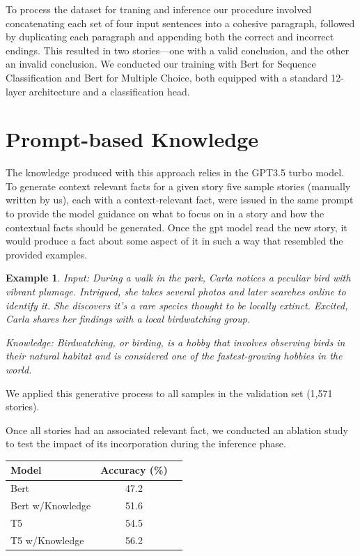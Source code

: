 \documentclass{article}
\begin{document}
\begin{multicols}{2}
To process the dataset for traning and inference our procedure involved concatenating each set of four input sentences into a cohesive paragraph, followed by duplicating each paragraph and appending both the correct and incorrect endings. This resulted in two stories—one with a valid conclusion, and the other an invalid conclusion. We conducted our training with Bert for Sequence Classification and Bert for Multiple Choice, both equipped with a standard 12-layer architecture and a classification head. 

\section{Prompt-based Knowledge}
The knowledge produced with this approach relies in the GPT3.5 turbo model. To generate context relevant facts for a given story five sample stories (manually written by us), each with a context-relevant fact, were issued in the same prompt to provide the model guidance on what to focus on in a story and how the contextual facts should be generated. Once the gpt model read the new story, it would produce a fact about some aspect of it in such a way that resembled the provided examples. 

\newtheorem{example}{Example}


\begin{example}

Input: During a walk in the park, Carla notices a peculiar bird with vibrant plumage. Intrigued, she takes several photos and later searches online to identify it. She discovers it's a rare species thought to be locally extinct. Excited, Carla shares her findings with a local birdwatching group.


Knowledge: Birdwatching, or birding, is a hobby that involves observing birds in their natural habitat and is considered one of the fastest-growing hobbies in the world.
    
\end{example}

We applied this generative process to all samples in the validation set (1,571 stories).

Once all stories had an associated relevant fact, we conducted an ablation study to test the impact of its incorporation during the inference phase. 

\vspace{0.2cm}
\begin{tabular}{lcc}
\toprule
Model & Accuracy (\%) \\
\midrule
Bert & 47.2 \\
Bert w/Knowledge & 51.6 \\
T5 & 54.5 \\
T5 w/Knowledge & 56.2 \\
\bottomrule
\end{tabular}
\vspace{0.3cm}


\end{multicols}
\end{document}
